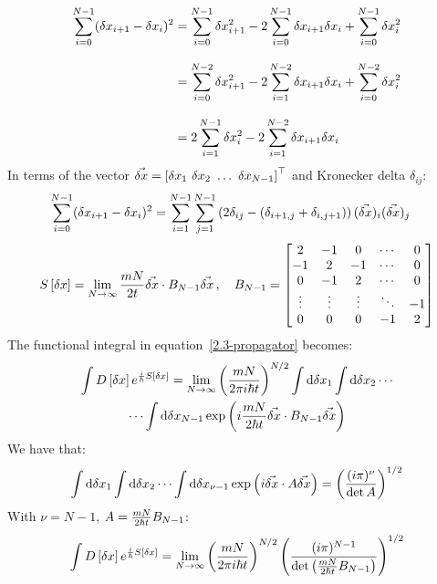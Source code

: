 \begin{align*}
  \sum_{i=0}^{N-1} (\delta{x}_{i+1}-\delta{x}_i)^2
   & =
  \sum_{i=0}^{N-1} \delta{x}_{i+1}^2 -
  2\sum_{i=0}^{N-1} \delta{x}_{i+1}\delta{x}_i +
  \sum_{i=0}^{N-1} \delta{x}_{i}^2
  \\[2ex]
   & =
  \sum_{i=0}^{N-2} \delta{x}_{i+1}^2 -
  2\sum_{i=1}^{N-2} \delta{x}_{i+1}\delta{x}_i +
  \sum_{i=0}^{N-2} \delta{x}_{i}^2
  \\[2ex]
   & =
  2\sum_{i=1}^{N-1} \delta{x}_{i}^2 -
  2\sum_{i=1}^{N-2} \delta{x}_{i+1}\delta{x}_i
\end{align*}
In terms of the vector
$\vec{\xd} = \left[\xd_1\ \xd_2\ \dots\ \xd_{N-1}\right]^\top$
and Kronecker delta $\delta_{ij}$:
\begin{align*}
  \sum_{i=0}^{N-1} (\delta{x}_{i+1}-\delta{x}_i)^2
   & =
  \sum_{i=1}^{N-1} \sum_{j=1}^{N-1}
  \left(2\delta_{ij} - (\delta_{i+1,j}+\delta_{i,j+1})\right)
  (\vec{\delta{x}})_{i}(\vec{\delta{x}})_{j}
\end{align*}
\begin{equation*}
  S\left[{\delta{x}}\right]
  =
  \lim_{N\to\infty}\frac{mN}{2t}\vec{\delta{x}}\cdot B_{N-1}\vec{\delta{x}}
  \,,\quad
  B_{N-1} =
  \begin{bmatrix}
    2      & - 1    & 0      & \cdots & 0
    \\
    -1     & 2      & -1     & \cdots & 0
    \\
    0      & -1     & 2      & \cdots & 0
    \\
    \vdots & \vdots & \vdots & \ddots & -1
    \\
    0      & 0      & 0      & -1     & 2
  \end{bmatrix}
\end{equation*}
The functional integral in equation~\ref{2.3-propagator} becomes:
\begin{multline}
  \label{2.3-deviation-action}
  \int D\left[{\delta{x}}\right] e^{\frac{i}{\hbar} S\left[{\delta{x}}\right]}
  =
  \lim_{N \to \infty}
  \left(\frac{mN}{2\pi i\hbar t}\right)^{N/2}
  \int\text{d}\delta{x}_{1}\int\text{d}\delta{x}_{2}\cdots
  \\
  \cdots\int\text{d}\delta{x}_{N-1}
  \exp\left(i \frac{mN}{2\hbar t} \vec{\delta{x}}\cdot B_{N-1}\vec{\delta{x}}\right)
\end{multline}
We have that:
\begin{equation}
  \label{2.3-integral}
  \int\text{d}\delta{x}_{1}\int\text{d}\delta{x}_{2}\cdots\int\text{d}\delta{x}_{\nu-1}
  \exp\left(i\vec{\delta{x}}\cdot A\vec{\delta{x}}\right)
  =
  \left(\frac{(i\pi)^\nu}{\det A}\right)^{1/2}
\end{equation}
With $\nu = N-1$, $A = \frac{mN}{2\hbar t} B_{N-1}$:
\begin{equation*}
  \int D\left[{\delta{x}}\right] e^{\frac{i}{\hbar} S\left[{\delta{x}}\right]}
  =
  \lim_{N \to \infty}
  \left(\frac{mN}{2\pi i\hbar t}\right)^{N/2}
  \left(\frac{(i\pi)^{N-1}}{\det\left(\frac{mN}{2\hbar t}B_{N-1}\right)}\right)^{1/2}
\end{equation*}
